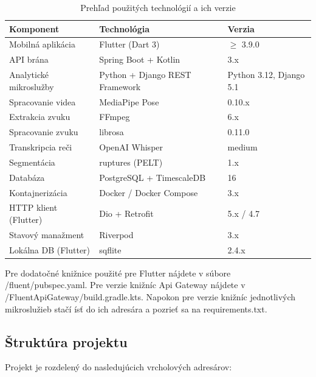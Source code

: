 \begin{table}[ht]
\centering
\caption{Prehľad použitých technológií a ich verzie}
\begin{tabular}{|l|l|l|}
\hline
\textbf{Komponent} & \textbf{Technológia} & \textbf{Verzia} \\
\hline
Mobilná aplikácia & Flutter (Dart 3) & $\geq$ 3.9.0 \\
API brána & Spring Boot + Kotlin & 3.x \\
Analytické mikroslužby & Python + Django REST Framework & Python 3.12, Django 5.1 \\
Spracovanie videa & MediaPipe Pose & 0.10.x \\
Extrakcia zvuku & FFmpeg & 6.x \\
Spracovanie zvuku & librosa & 0.11.0 \\
Transkripcia reči & OpenAI Whisper & medium \\
Segmentácia & ruptures (PELT) & 1.x \\
Databáza & PostgreSQL + TimescaleDB & 16 \\
Kontajnerizácia & Docker / Docker Compose & 3.x \\
HTTP klient (Flutter) & Dio + Retrofit & 5.x / 4.7 \\
Stavový manažment & Riverpod & 3.x \\
Lokálna DB (Flutter) & sqflite & 2.4.x \\
\hline
\end{tabular}
\end{table}

Pre dodatočné knižnice použité pre Flutter nájdete v súbore /fluent/pubspec.yaml.
Pre verzie knižníc Api Gateway nájdete v /FluentApiGateway/build.gradle.kts.
Napokon pre verzie knižníc jednotlivých mikroslužieb stačí ísť do ich adresára a pozrieť sa na requirements.txt.

\subsection{Štruktúra projektu}

Projekt je rozdelený do nasledujúcich vrcholových adresárov:

